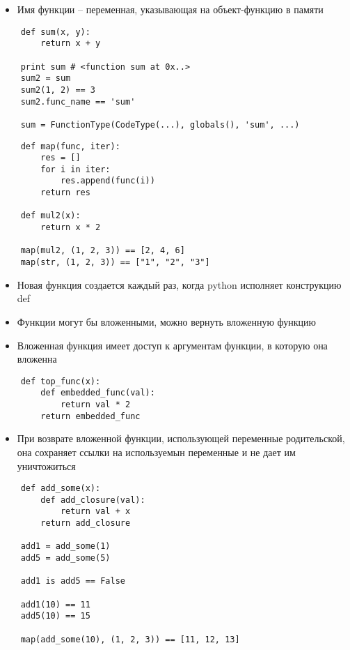 \documentclass{article}
\begin{document}
\begin{itemize}
	\item Имя функции – переменная, указывающая на объект-функцию в памяти
\end{itemize}
\vspace{15pt}
\begin{lstlisting}
	def sum(x, y):
	    return x + y

	print sum # <function sum at 0x..>
	sum2 = sum
	sum2(1, 2) == 3
	sum2.func_name == 'sum'

	sum = FunctionType(CodeType(...), globals(), 'sum', ...)
\end{lstlisting}
\newpage

\vspace{15pt}
\begin{lstlisting}
	def map(func, iter):
	    res = []
	    for i in iter:
	        res.append(func(i))
	    return res

	def mul2(x):
	    return x * 2

	map(mul2, (1, 2, 3)) == [2, 4, 6]
	map(str, (1, 2, 3)) == ["1", "2", "3"]
\end{lstlisting}
\newpage

\begin{itemize}
	\item Новая функция создается каждый раз, когда python исполняет конструкцию def
	\item Функции могут бы вложенными, можно вернуть вложенную функцию
	\item Вложенная функция имеет доступ к аргументам функции, в которую она вложенна
\end{itemize}
\vspace{15pt}
\begin{lstlisting}
	def top_func(x):
	    def embedded_func(val):
	        return val * 2
	    return embedded_func
\end{lstlisting}
\newpage

\begin{itemize}
	\item При возврате вложенной функции, использующей переменные родительской,
		она сохраняет ссылки на используемын переменные и не дает им уничтожиться
\end{itemize}
\vspace{15pt}
\begin{lstlisting}
	def add_some(x):
	    def add_closure(val):
	        return val + x
	    return add_closure

	add1 = add_some(1)
	add5 = add_some(5)

	add1 is add5 == False

	add1(10) == 11
	add5(10) == 15

	map(add_some(10), (1, 2, 3)) == [11, 12, 13]
\end{lstlisting}
\newpage
\end{document}
